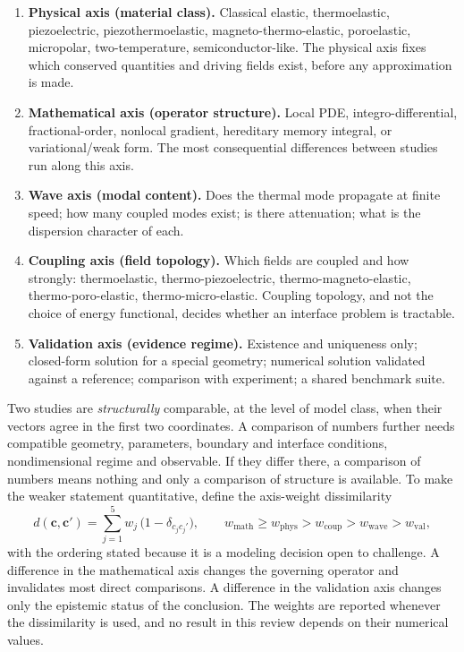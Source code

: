 \begin{enumerate}[label=\textbf{Axis \arabic*:}]
\item \textbf{Physical axis (material class).} Classical elastic, thermoelastic, piezoelectric,
  piezothermoelastic, magneto-thermo-elastic, poroelastic, micropolar, two-temperature, semiconductor-like.
  The physical axis fixes which conserved quantities and driving fields exist, before any approximation is made.
\item \textbf{Mathematical axis (operator structure).} Local PDE, integro-differential, fractional-order,
  nonlocal gradient, hereditary memory integral, or variational/weak form. The most consequential
  differences between studies run along this axis.
\item \textbf{Wave axis (modal content).} Does the thermal mode propagate at finite speed; how many coupled
  modes exist; is there attenuation; what is the dispersion character of each.
\item \textbf{Coupling axis (field topology).} Which fields are coupled and how strongly:
  thermoelastic, thermo-piezoelectric, thermo-magneto-elastic, thermo-poro-elastic, thermo-micro-elastic.
  Coupling topology, and not the choice of energy functional, decides whether an interface problem is
  tractable.
\item \textbf{Validation axis (evidence regime).} Existence and uniqueness only; closed-form solution for a
  special geometry; numerical solution validated against a reference; comparison with experiment; a shared
  benchmark suite.
\end{enumerate}

Two studies are \emph{structurally} comparable, at the level of model class, when their vectors agree in the first two coordinates. A comparison of numbers further needs compatible geometry, parameters, boundary and interface conditions, nondimensional regime and observable. If they
differ there, a comparison of numbers means nothing and only a comparison of structure is available. To
make the weaker statement quantitative, define the axis-weight dissimilarity
\begin{equation}\label{eq:taxdissim}
d(\mathbf{c},\mathbf{c}')=\sum_{j=1}^{5} w_j\,\bigl(1-\delta_{c_j c_j'}\bigr),
\qquad
w_{\mathrm{math}}\ge w_{\mathrm{phys}}>w_{\mathrm{coup}}>w_{\mathrm{wave}}>w_{\mathrm{val}} ,
\end{equation}
with the ordering stated because it is a modeling decision open to challenge. A difference in the mathematical axis changes the governing operator and invalidates most direct comparisons. A difference in the validation axis changes only the epistemic status of the conclusion. The weights are reported whenever the dissimilarity is used, and no result in this review depends on their numerical values.

